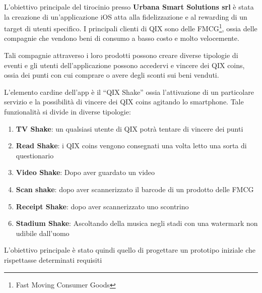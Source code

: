 \normalsize
L’obiettivo principale del tirocinio presso \textbf{Urbana Smart Solutions srl}\cite{urbanasmartsolutions} è stata la creazione di un'applicazione iOS atta alla fidelizzazione e al rewarding di un target di utenti specifico. I principali clienti di QIX sono delle FMCG\footnote{Fast Moving Consumer Goods}, ossia delle compagnie che vendono beni di consumo a basso costo e molto velocemente.

Tali compagnie attraverso i loro prodotti possono creare diverse tipologie di eventi e gli utenti dell’applicazione possono accedervi e vincere dei QIX coins, ossia dei punti con cui comprare o avere degli sconti sui beni venduti.


L’elemento cardine dell’app è il “QIX Shake” ossia l’attivazione di un particolare servizio e
la possibilità di vincere dei QIX coins agitando lo smartphone. Tale funzionalità si divide in diverse tipologie:

\begin{enumerate}
    \item\textbf{TV Shake}: un qualsiasi utente di QIX potrà tentare di vincere dei punti
    \item\textbf{Read Shake}: i QIX coins vengono consegnati una volta letto una sorta di questionario
    \item\textbf{Video Shake}: Dopo aver guardato un video
    \item\textbf{Scan shake}: dopo aver scannerizzato il barcode di un prodotto delle FMCG
    \item\textbf{Receipt Shake}: dopo aver scannerizzato uno scontrino
    \item\textbf{Stadium Shake}: Ascoltando della musica negli stadi con una watermark non udibile dall'uomo
\end{enumerate}

L'obiettivo principale è stato quindi quello di progettare
un prototipo iniziale che rispettasse determinati requisiti

